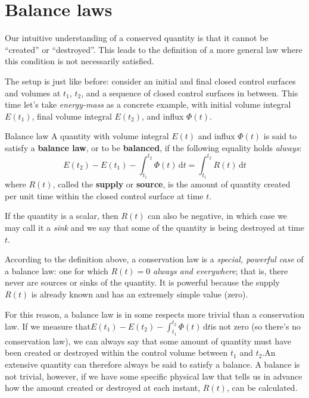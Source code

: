 \documentclass[a4paper,12pt,%
onecolumn,oneside,titlepage,%
british%
]{memoir}
\newcommand*{\di}{\mathrm{d}}%
\renewcommand*{\|}[1][]{\nonscript\:#1\vert\nonscript\:\mathopen{}}
\newcommand*{\yE}{E}
\newcommand*{\yH}{\varPhi}%
\newcommand*{\yR}{R}%
\newcommand*{\energym}{energy-mass}
\begin{document}
\section{Balance laws}
\label{sec:balance_laws}

Our intuitive understanding of a conserved quantity is that it cannot be \enquote{created} or \enquote{destroyed}. This leads to the definition of a more general law where this condition is not necessarily satisfied.

The setup is just like before: consider an initial and final closed control surfaces and volumes at $t_{1}$, $t_{2}$, and a sequence of closed control surfaces in between. This time let's take \emph{\energym} as a concrete example, with initial volume integral $\yE(t_{1})$, final volume integral $\yE(t_{2})$, and influx $\yH(t)$.

\begin{definition}{Balance law}
  A quantity with volume integral $\yE(t)$ and influx $\yH(t)$ is said to satisfy a \textbf{balance law}, or to be \textbf{balanced}, if the following equality holds \emph{always}:
  \begin{equation}
    \label{eq:balanced}
    \yE(t_{2}) - \yE(t_{1}) - \int_{t_{1}}^{t_{2}}\!\!\yH(t)\, \di t = \int_{t_{1}}^{t_{2}}\!\!\yR(t)\,\di t
  \end{equation}
  where $\yR(t)$, called the \textbf{supply} or \textbf{source}, is the amount of quantity created per unit time within the closed control surface at time $t$.
\end{definition}
If the quantity is a scalar, then $\yR(t)$ can also be negative, in which case we may call it a \emph{sink} and we say that some of the quantity is being destroyed at time $t$.

\smallskip

According to the definition above, a conservation law is a \emph{special, powerful case} of a balance law: one for which $\yR(t)=0$ \emph{always and everywhere}; that is, there never are sources or sinks of the quantity. It is powerful because the supply $\yR(t)$ is already known and has an extremely simple value (zero).

For this reason, a balance law is in some respects more trivial than a conservation law. If we measure that\enspace$\yE(t_{1}) - \yE(t_{2}) - \int_{t_{1}}^{t_{2}}\!\yH(t)\, \di t$\enspace is not zero (so there's no conservation law), we can always say that some amount of quantity must have been created or destroyed within the control volume between $t_{1}$ and $t_{2}$.\enspace An extensive quantity can therefore always be said to satisfy a balance. A balance is not trivial, however, if we have some specific physical law that tells us in advance how the amount created or destroyed at each instant, $\yR(t)$, can be calculated.
\end{document}
